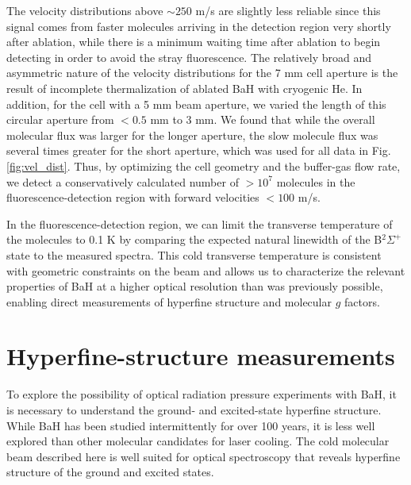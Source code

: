 \documentclass[amsmath,amssymb,aps,twocolumn,longbibliography,notitlepage]{revtex4-1}
\begin{document}
The velocity distributions above $\sim250$ m/s are slightly less reliable since this signal comes from faster molecules arriving in the detection region very shortly after ablation, while there is a minimum waiting time after ablation to begin detecting in order to avoid the stray fluorescence.  The relatively broad and asymmetric nature of the velocity distributions for the 7 mm cell aperture is the result of incomplete thermalization of ablated BaH with cryogenic He.  In addition, for the cell with a 5 mm beam aperture, we varied the length of this circular aperture from $<0.5$ mm to 3 mm.  We found that while the overall molecular flux was larger for the longer aperture, the slow molecule flux was several times greater for the short aperture, which was used for all data in Fig. \ref{fig:vel_dist}.  Thus, by optimizing the cell geometry and the buffer-gas flow rate, we detect a conservatively calculated number of $>10^7$ molecules in the fluorescence-detection region with forward velocities $<100$ m/s.

In the fluorescence-detection region, we can limit the transverse temperature of the molecules to 0.1 K by comparing the expected natural linewidth of the B$^2\Sigma^+$ state \cite{BergPS97_BaHLifetime} to the measured spectra.  This cold transverse temperature is consistent with geometric constraints on the beam and allows us to characterize the relevant properties of BaH at a higher optical resolution than was previously possible, enabling direct measurements of hyperfine structure and molecular $g$ factors.

\section{Hyperfine-structure measurements}
\label{sec:Hyperfine}

To explore the possibility of optical radiation pressure experiments with BaH, it is necessary to understand the ground- and excited-state hyperfine structure.  While BaH has been studied intermittently for over 100 years, it is less well explored than other molecular candidates for laser cooling.  The cold molecular beam described here is well suited for optical spectroscopy that reveals hyperfine structure of the ground and excited states.
\end{document}
